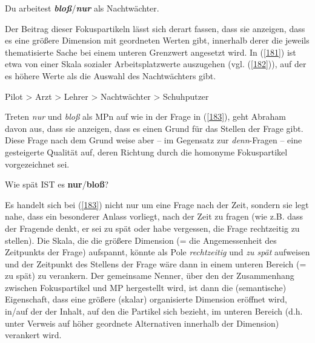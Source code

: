 \begin{exe}
	\ex\label{181} 
	Du arbeitest \textit{\textbf{bloß}}/\textit{\textbf{nur}} als Nachtwächter.
	\hfill\hbox {\citet[101]{Abraham1995}}
\end{exe}	
Der Beitrag dieser Fokuspartikeln lässt sich derart fassen, dass sie anzeigen, dass es eine größere  Dimension mit geordneten Werten gibt, innerhalb derer die je\-weils thematisierte Sache bei einem unteren Grenzwert angesetzt wird. In (\ref{181}) ist etwa von einer Skala sozialer Arbeitsplatzwerte auszugehen (vgl. (\ref{182})), auf der es höhere Werte als die Auswahl des Nachtwächters gibt.

\begin{exe}
	\ex\label{182} 
	Pilot > Arzt > Lehrer > Nachtwächter > Schuhputzer
\end{exe}	
Treten \textit{nur} und \textit{bloß} als MPn auf wie in der Frage in (\ref{183}), geht Abraham davon aus, dass sie anzeigen, dass es einen Grund für das Stellen der Frage gibt. Diese Frage nach dem Grund weise aber – im Gegensatz zur \textit{denn}-Fragen – eine gestei\-gerte Qualität auf, deren Richtung durch die homonyme Fokuspartikel vorgezeichnet sei.

\begin{exe}
	\ex\label{183} 
	Wie spät IST es \textbf{nur}/\textbf{bloß}?
	\hfill\hbox {\citet[101]{Abraham1995}}
\end{exe}												        		       
Es handelt sich bei (\ref{183}) nicht nur um eine Frage nach der Zeit, sondern sie legt nahe, dass ein besonderer Anlass vorliegt, nach der Zeit zu fragen (wie z.B. dass der Fragende denkt, er sei zu spät oder habe vergessen, die Frage rechtzeitig zu stellen). Die Skala, die die größere Dimension (= die Angemessenheit des Zeitpunkts der Frage) aufspannt, könnte als Pole \textit{rechtzeitig} und \textit{zu spät} aufweisen und der Zeitpunkt des Stellens der Frage wäre dann in einem unteren Bereich (= zu spät) zu verankern. Der gemeinsame Nenner, über den der Zusammenhang zwischen Fokuspartikel  und MP hergestellt wird, ist dann die (semantische) Eigenschaft, dass eine größere (skalar) organisierte Dimension eröffnet wird, in/auf der der Inhalt, auf den die Partikel sich bezieht, im unteren Bereich (d.h. unter Verweis auf höher geordnete Alternativen innerhalb der Dimension) verankert wird.


